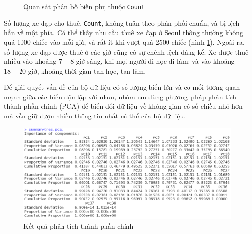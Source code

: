 \begin{figure}[H]
	\centering
		\hfill
	\caption{Quan sát phân bố biến phụ thuộc \texttt{Count}}
	\label{A2_visual3}
\end{figure}

Số lượng xe đạp cho thuê, \texttt{Count}, không tuân theo phân phối chuẩn, và bị lệch hẳn về một phía. Có thể thấy nhu cầu thuê xe đạp ở Seoul thông thường không quá 1000 chiếc vào mỗi giờ, và rất ít khi vượt quá 2500 chiếc (hình \ref{A2_visual3}). Ngoài ra, số lượng xe đạp được thuê ở các giờ cũng có sự chênh lệch đáng kể. Xe được thuê nhiều vào khoảng $7-8$ giờ sáng, khi mọi người đi học đi làm; và vào khoảng $18-20$ giờ, khoảng thời gian tan học, tan làm.

\bigskip
Để giải quyết vấn đề của bộ dữ liệu có số lượng biến lớn và có mối tương quan mạnh giữa các biến độc lập với nhau, nhóm em dùng phương~pháp phân tích thành phần chính (PCA) để biến đổi dữ liệu về không gian có số chiều nhỏ hơn mà vẫn giữ được nhiều thông tin nhất có thể của bộ dữ liệu.

\begin{figure}[H]
	\centering
	\includegraphics[width=0.8\linewidth]{../Photo Of Result/A2_PCproportion.PNG}
	\caption{Kết quả phân tích thành phần chính }
	\label{A2_Var}
\end{figure}

